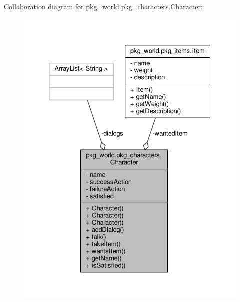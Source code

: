Collaboration diagram for pkg\-\_\-world.\-pkg\-\_\-characters.\-Character\-:\nopagebreak
\begin{figure}[H]
\begin{center}
\leavevmode
\includegraphics[width=327pt]{classpkg__world_1_1pkg__characters_1_1Character__coll__graph}
\end{center}
\end{figure}
